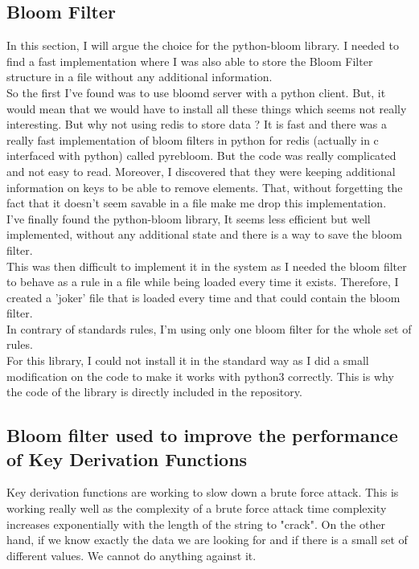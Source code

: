 \documentclass{eplmastersthesis}
\begin{document}
\subsection{Bloom Filter}
In this section, I will argue the choice for the python-bloom library. I needed to find a fast implementation where I was also able to store the Bloom Filter structure in a file without any additional information.\\
So the first I've found was to use bloomd server with a python client. But, it would mean that we would have to install all these things which seems not really interesting. But why not using redis to store data ? It is fast and there was a really fast implementation of bloom filters in python for redis (actually in c interfaced with python) called pyrebloom. But the code was really complicated and not easy to read. Moreover, I discovered that they were keeping additional information on keys to be able to remove elements. That, without forgetting the fact that it doesn't seem savable in a file make me drop this implementation.\\
I've finally found the python-bloom library, It seems less efficient but well implemented, without any additional state and there is a way to save the bloom filter.\\

This was then difficult to implement it in the system as I needed the bloom filter to behave as a rule in a file while being loaded every time it exists. Therefore, I created a 'joker' file that is loaded every time and that could contain the bloom filter.\\
In contrary of standards rules, I'm using only one bloom filter for the whole set of rules.\\

For this library, I could not install it in the standard way as I did a small modification on the code to make it works with python3 correctly. This is why the code of the library is directly included in the repository.


\subsection{Bloom filter used to improve the performance of Key Derivation Functions}
Key derivation functions are working to slow down a brute force attack. This is working really well as the complexity of a brute force attack time complexity increases exponentially with the length of the string to "crack". On the other hand, if we know exactly the data we are looking for and if there is a small set of different values. We cannot do anything against it. \\
\end{document}
